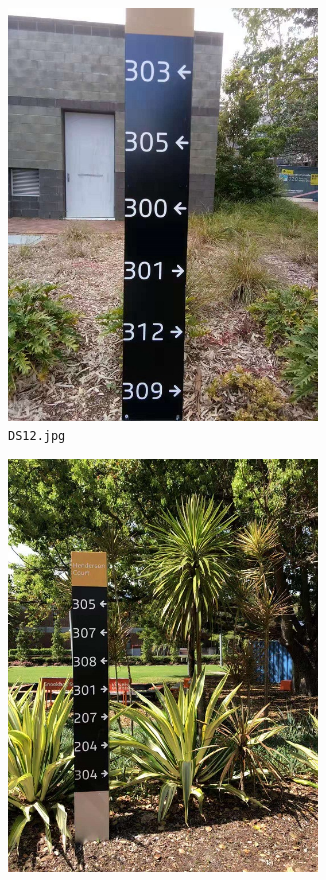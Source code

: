 \documentclass{article}
\begin{document}
\begin{figure}[h]
\begin{subfigure}[h]{0.22\textwidth}
    \includegraphics[width=0.9\textwidth]{../train/task2/DS12}
    \caption[DS12]{
      \lstinline{DS12.jpg}
    }
    \label{fig:ds12}
  \end{subfigure}
  \begin{subfigure}[h]{0.22\textwidth}
    \centering
    \includegraphics[width=0.9\textwidth]{../train/task2/DS13}

\end{subfigure}
\end{figure}
\end{document}
